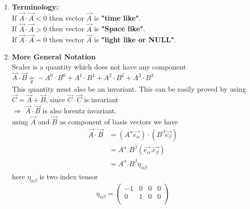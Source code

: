 \documentclass[11pt,a4paper]{article}
\begin{document}
\begin{enumerate}
\begin{enumerate}
\begin{enumerate}
                              \item \textbf{Terminology:}\\
                                    If $\vec{A}\cdot\vec{A} < 0$ then vector $\vec{A}$ is \textbf{"time like"}.\\
                                    If $\vec{A}\cdot\vec{A} > 0$ then vector $\vec{A}$ is \textbf{"Space like"}.\\
                                    If $\vec{A}\cdot\vec{A} = 0$ then vector $\vec{A}$ is \textbf{"light like or NULL"}.\\
                              \item \textbf{More General Notation}\\
                                    Scaler is a quantity which does not have any component\\
                                    $\vec{A}\cdot\vec{B} \mathop = \limits^{.}_{\theta} - A^0\cdot B^0 + A^1\cdot B^1 + A^2\cdot B^2 + A^3\cdot B^3$\\
                                    This quantity must also be an invariant. This can be easily proved by using $\vec{C}=\vec{A}+\vec{B}$, since $\vec{C}\cdot\vec{C}$ is invariant\\
                                    $\Rightarrow$ $ \vec{A}\cdot\vec{B}$ is also lorentz invariant.\\
                                    using $\vec{A}$ and $\vec{B}$ as component of basis vectors we have
                                    \begin{align*}
                                          \vec{A}\cdot\vec{B} & = (A^{\alpha}\vec{e_{\alpha}})\cdot(B^{\beta}\vec{e_{\beta}}) \\
                                                              & = A^{\alpha}.B^{\beta} (\vec{e_{\alpha}}.\vec{e_{\beta}})     \\
                                                              & = A^{\alpha}.B^{\beta} {\displaystyle{\eta_{\alpha\beta}}}
                                    \end{align*}
                                    here ${\displaystyle{\eta_{\alpha\beta}}}$ is two index tensor
                                    \[ {\displaystyle{\eta_{\alpha\beta}}} = \begin{pmatrix}
                                                -1 & 0 & 0 & 0 \\
                                                0  & 1 & 0 & 0 \\

\end{pmatrix}\]
\end{enumerate}
\end{enumerate}
\end{enumerate}
\end{document}
